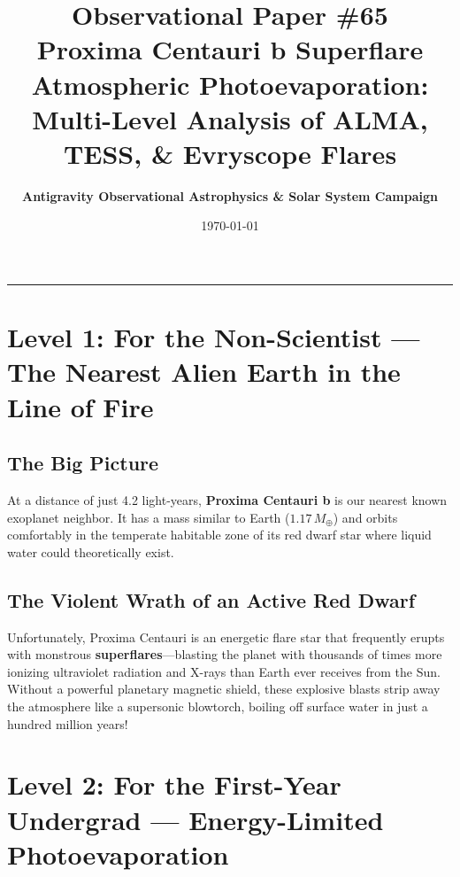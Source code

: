 \documentclass[11pt,a4paper]{article}
\title{\Huge \textbf{Observational Paper \#65}\\ \Large Proxima Centauri b Superflare Atmospheric Photoevaporation: Multi-Level Analysis of ALMA, TESS, \& Evryscope Flares}
\author{\textbf{Antigravity Observational Astrophysics \& Solar System Campaign}}
\date{\today}
\begin{document}
\maketitle

\vspace{-1em}
\begin{center}
\rule{\textwidth}{1.5pt}
\end{center}

\section*{Level 1: For the Non-Scientist — The Nearest Alien Earth in the Line of Fire}

\subsection*{The Big Picture}
At a distance of just 4.2 light-years, \textbf{Proxima Centauri b} is our nearest known exoplanet neighbor. It has a mass similar to Earth ($1.17\,M_\oplus$) and orbits comfortably in the temperate habitable zone of its red dwarf star where liquid water could theoretically exist.

\subsection*{The Violent Wrath of an Active Red Dwarf}
Unfortunately, Proxima Centauri is an energetic flare star that frequently erupts with monstrous \textbf{superflares}—blasting the planet with thousands of times more ionizing ultraviolet radiation and X-rays than Earth ever receives from the Sun. Without a powerful planetary magnetic shield, these explosive blasts strip away the atmosphere like a supersonic blowtorch, boiling off surface water in just a hundred million years!

\newpage

\section*{Level 2: For the First-Year Undergrad — Energy-Limited Photoevaporation}
\end{document}
